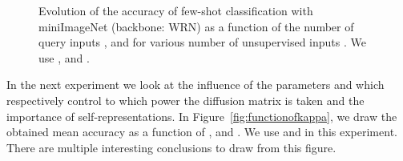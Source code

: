 \documentclass[a4paper,conference]{IEEEtran}
\begin{document}
\begin{figure}[h]
  \begin{center}
  \end{center}
  \vspace{-.5cm}
  \caption{Evolution of the accuracy of few-shot classification with miniImageNet (backbone: WRN) as a function of the number of query inputs , and for various number of unsupervised inputs . We use ,  and .}
  \label{fig:functionofq}
\end{figure}



In the next experiment we look at the influence of the parameters  and  which respectively control to which power the diffusion matrix is taken and the importance of self-representations. In Figure~\ref{fig:functionofkappa}, we draw the obtained mean accuracy as a function of ,  and . We use  and  in this experiment. There are multiple interesting conclusions to draw from this figure. 
\end{document}
